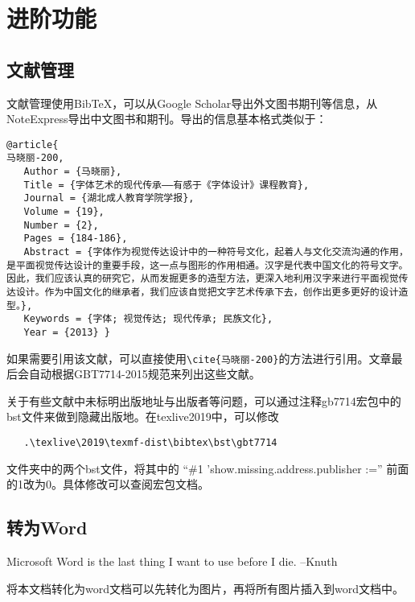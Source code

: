 \section{进阶功能}
\subsection{文献管理}
文献管理使用Bib\TeX ，可以从Google Scholar导出外文图书期刊等信息，从NoteExpress导出中文图书和期刊\cite{刘运来-199}。导出的信息基本格式类似于：
\begin{verbatim}
@article{
马晓丽-200,
   Author = {马晓丽},
   Title = {字体艺术的现代传承——有感于《字体设计》课程教育},
   Journal = {湖北成人教育学院学报},
   Volume = {19},
   Number = {2},
   Pages = {184-186},
   Abstract = {字体作为视觉传达设计中的一种符号文化，起着人与文化交流沟通的作用，是平面视觉传达设计的重要手段，这一点与图形的作用相通。汉字是代表中国文化的符号文字。因此，我们应该认真的研究它，从而发掘更多的造型方法，更深入地利用汉字来进行平面视觉传达设计。作为中国文化的继承者，我们应该自觉把文字艺术传承下去，创作出更多更好的设计造型。},
   Keywords = {字体; 视觉传达; 现代传承; 民族文化},
   Year = {2013} }
\end{verbatim}
如果需要引用该文献，可以直接使用\verb|\cite{马晓丽-200}|的方法进行引用。文章最后会自动根据GBT7714-2015规范来列出这些文献。

关于有些文献中未标明出版地址与出版者等问题，可以通过注释gb7714宏包中的bst文件来做到隐藏出版地。在texlive2019中，可以修改
\begin{verbatim}
   .\texlive\2019\texmf-dist\bibtex\bst\gbt7714
\end{verbatim}
文件夹中的两个bst文件，将其中的  “\#1 'show.missing.address.publisher :=” 前面的1改为0。具体修改可以查阅宏包文档。
\subsection{转为Word}
Microsoft Word is the last thing I want to use before I die.
--Knuth

将本文档转化为word文档可以先转化为图片，再将所有图片插入到word文档中。